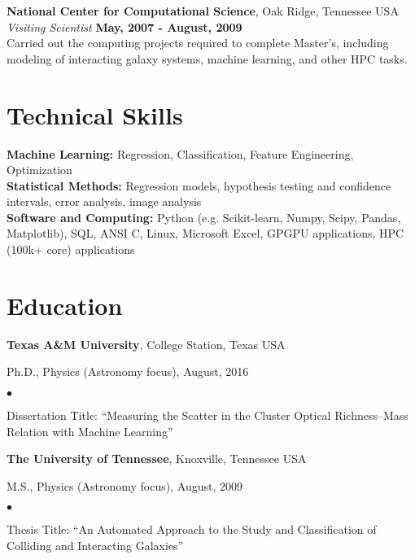 \documentclass[margin,line, 11pt]{res}
\newenvironment{list1}{
  \begin{list}{\ding{113}}{%
      \setlength{\itemsep}{0in}
      \setlength{\parsep}{0in} \setlength{\parskip}{0in}
      \setlength{\topsep}{0in} \setlength{\partopsep}{0in} 
      \setlength{\leftmargin}{0.17in}}}{\end{list}}
\newenvironment{list2}{
  \begin{list}{$\bullet$}{%
      \setlength{\itemsep}{0in}
      \setlength{\parsep}{0in} \setlength{\parskip}{0in}
      \setlength{\topsep}{0in} \setlength{\partopsep}{0in} 
      \setlength{\leftmargin}{0.2in}}}{\end{list}}
\begin{document}
\begin{resume}
\textbf{National Center for Computational Science}, Oak Ridge, Tennessee USA\\
\textit{Visiting Scientist} \hfill \textbf{May, 2007 - August, 2009}\\
Carried out the computing projects required to complete Master's, including
modeling of interacting galaxy systems, machine learning, and other HPC tasks. 

\section{Technical Skills}
\textbf{Machine Learning:} Regression, Classification, Feature Engineering, Optimization\\
\textbf{Statistical Methods:} Regression models, hypothesis testing and confidence intervals, error analysis, image analysis\\
\textbf{Software and Computing:}  Python (e.g. Scikit-learn, Numpy, Scipy, Pandas, Matplotlib), SQL, ANSI C, Linux, Microsoft Excel, GPGPU applications, HPC (100k+ core) applications\\
\vspace*{-5mm}

\section{Education}
\textbf{Texas A\&M University}, College Station, Texas USA\\
\vspace*{-.1in}
\begin{list1}
    \item[]Ph.D., Physics (Astronomy focus), August, 2016
    \begin{list2}
        \item Dissertation Title: ``Measuring the Scatter in the Cluster Optical Richness--Mass\\ Relation with Machine Learning'' 
    \end{list2}
\end{list1}
\vspace*{-3mm}

\textbf{The University of Tennessee}, Knoxville, Tennessee USA\\
\vspace*{-.1in}
\begin{list1}
    \item[] M.S., Physics (Astronomy focus),  August, 2009
    \begin{list2}
        \vspace*{.05in}
        \item Thesis Title: ``An Automated Approach to the Study and Classification of Colliding and Interacting Galaxies''
    \end{list2}
\end{list1}
\vspace*{-3mm}


\end{resume}
\end{document}
